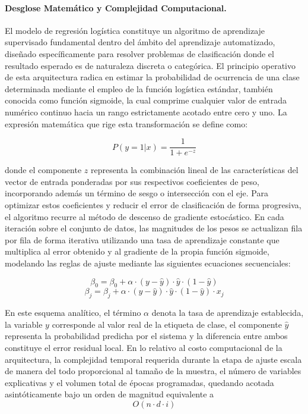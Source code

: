 \documentclass[11pt,a4paper]{report}
\begin{document}
    \paragraph{Desglose Matemático y Complejidad Computacional.}
    El modelo de regresión logística constituye un algoritmo de aprendizaje supervisado fundamental dentro del ámbito del
    aprendizaje automatizado, diseñado específicamente para resolver problemas de clasificación donde el resultado esperado es de
    naturaleza discreta o categórica. El principio operativo de esta arquitectura radica en estimar la probabilidad de ocurrencia de una
    clase determinada mediante el empleo de la función logística estándar, también conocida como función sigmoide, la cual comprime cualquier
    valor de entrada numérico continuo hacia un rango estrictamente acotado entre cero y uno. La expresión matemática que rige esta transformación se define como:

    $$P(y=1|x) = \frac{1}{1 + e^{-z}}$$

    donde el componente $z$ representa la combinación lineal de las características del vector de entrada ponderadas por sus respectivos
    coeficientes de peso, incorporando además un término de sesgo o intersección con el eje. Para optimizar estos coeficientes y reducir
    el error de clasificación de forma progresiva, el algoritmo recurre al método de descenso de gradiente estocástico. En cada iteración sobre
    el conjunto de datos, las magnitudes de los pesos se actualizan fila por fila de forma iterativa utilizando una tasa de aprendizaje constante
    que multiplica al error obtenido y al gradiente de la propia función sigmoide, modelando las reglas de ajuste mediante las siguientes ecuaciones secuenciales:

    $$\beta_0 = \beta_0 + \alpha \cdot (y - \hat{y}) \cdot \hat{y} \cdot (1 - \hat{y})$$
    $$\beta_j = \beta_j + \alpha \cdot (y - \hat{y}) \cdot \hat{y} \cdot (1 - \hat{y}) \cdot x_j$$

    En este esquema analítico, el término $\alpha$ denota la tasa de aprendizaje establecida, la variable $y$
    corresponde al valor real de la etiqueta de clase, el componente $\hat{y}$ representa la probabilidad predicha por el sistema
    y la diferencia entre ambos constituye el error residual local. En lo relativo al costo computacional de la arquitectura,
    la complejidad temporal requerida durante la etapa de ajuste escala de manera del todo proporcional al tamaño de la muestra,
    el número de variables explicativas y el volumen total de épocas programadas, quedando acotada asintóticamente bajo un orden
    de magnitud equivalente a $$O(n \cdot d \cdot i)$$
\end{document}
